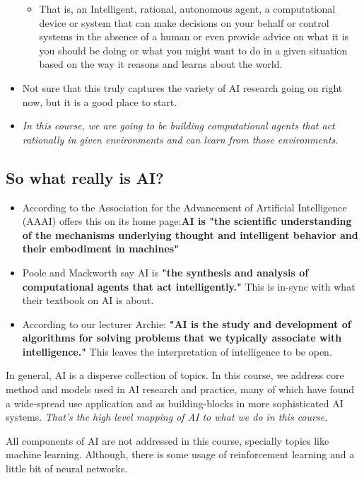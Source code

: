 \documentclass[12pt]{article}
\begin{document}
\begin{itemize}
\begin{itemize}
        \item That is, an Intelligent, rational, autonomous agent, a computational device or system that can make decisions on your behalf or control systems in the absence of a human or even provide advice on what it is you should be doing or what you might want to do in a given situation based on the way it reasons and learns about the world.
    \end{itemize}
    \item Not sure that this truly captures the variety of AI research going on right now, but it is a good place to start. 
    \item \emph{In this course, we are going to be building computational agents that act rationally in given environments and can learn from those environments.}
\end{itemize}

\subsection*{So what really is AI?}
\begin{itemize}
    \item According to the Association for the Advancement of Artificial Intelligence (AAAI) offers this on its home page:\textbf{AI is "the scientific understanding of the mechanisms underlying thought and intelligent behavior and their embodiment in machines"}
    \item Poole and Mackworth say AI is \textbf{"the synthesis and analysis of computational agents that act intelligently."} This is in-sync with what their textbook on AI is about.
    \item According to our lecturer Archie: \textbf{"AI is the study and development of algorithms for solving problems that we typically associate with intelligence."} This leaves the interpretation of intelligence to be open.
\end{itemize}

\noindent In general, AI is a disperse collection of topics. In this course, we address core method and models used in AI research and practice, many of which have found a wide-spread use application and as building-blocks in more sophisticated AI systems. 
\emph{That's the high level mapping of AI to what we do in this course.}

\noindent All components of AI are not addressed in this course, specially topics like machine learning. Although, there is some usage of reinforcement learning and a little bit of neural networks.
\end{document}

